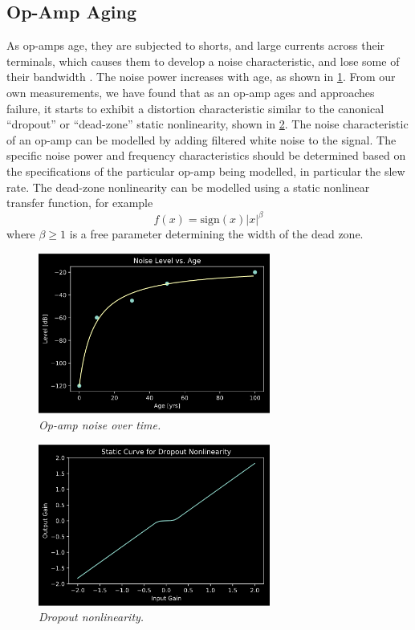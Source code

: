 \documentclass[twoside,a4paper]{article}
\begin{document}
\subsection{Op-Amp Aging} \label{sec:opamp-age}
%
As op-amps age, they are subjected to shorts, and large currents across
their terminals, which causes them to develop a noise characteristic,
and lose some of their bandwidth \cite{opamp-age}. The noise power
increases with age, as shown in \cref{opamp-age-noise}.
\newline\newline
From our own measurements, we have found that as an op-amp ages and
approaches failure, it starts to exhibit a distortion characteristic
similar to the canonical ``dropout'' or ``dead-zone'' static nonlinearity,
shown in \cref{dropout}.
\newline\newline
The noise characteristic of an op-amp can be modelled by adding
filtered white noise to the signal. The specific noise power and
frequency characteristics should be determined based on the
specifications of the particular op-amp being modelled, in particular
the slew rate. The dead-zone nonlinearity can be modelled using a
static nonlinear transfer function, for example
\begin{equation}
    f(x) = \text{sign} (x) |x|^{\beta}
\end{equation}
where $\beta \geq 1$ is a free parameter determining the
width of the dead zone.
%
\begin{figure}[h]
    \center
    \includegraphics[width=3in]{../OpAmp/Pics/age_noise.png}
    \caption{\label{opamp-age-noise}{\it Op-amp noise over time.}}
\end{figure}
%
\begin{figure}[h]
    \center
    \includegraphics[width=3in]{Pics/dropout.png}
    \caption{\label{dropout}{\it Dropout nonlinearity.}}
\end{figure}
%
\end{document}
